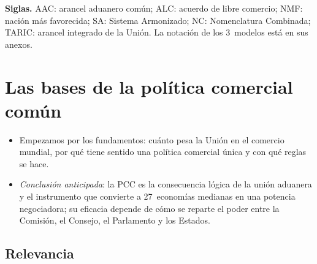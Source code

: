\documentclass[11pt]{article}
\begin{document}
\begin{anotaciones}
\textbf{Siglas.} AAC: arancel aduanero común; ALC: acuerdo de libre comercio; NMF: nación más favorecida; SA: Sistema Armonizado; NC: Nomenclatura Combinada; TARIC: arancel integrado de la Unión. La notación de los 3~modelos está en sus anexos.
\end{anotaciones}


\section{Las bases de la política comercial común}\label{sec:bases}

\begin{itemize}
\item Empezamos por los fundamentos: cuánto pesa la Unión en el comercio mundial, por qué tiene sentido una política comercial única y con qué reglas se hace.
\item \emph{Conclusión anticipada}: la PCC es la consecuencia lógica de la unión aduanera y el instrumento que convierte a 27~economías medianas en una potencia negociadora; su eficacia depende de cómo se reparte el poder entre la Comisión, el Consejo, el Parlamento y los Estados.
\end{itemize}

\subsection{Relevancia}\label{sec:relevancia}
\end{document}

